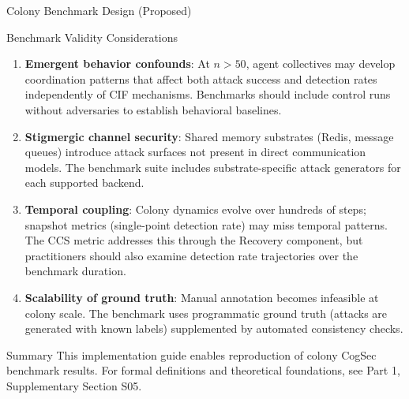 \documentclass[
  ignorenonframetext,
]{beamer}
\begin{document}
\begin{frame}[fragile]{Colony Benchmark Design (Proposed)}
\begin{block}{Benchmark Validity Considerations}
\begin{enumerate}
\item
  \textbf{Emergent behavior confounds}: At \(n > 50\), agent collectives
  may develop coordination patterns that affect both attack success and
  detection rates independently of CIF mechanisms. Benchmarks should
  include control runs without adversaries to establish behavioral
  baselines.
\item
  \textbf{Stigmergic channel security}: Shared memory substrates (Redis,
  message queues) introduce attack surfaces not present in direct
  communication models. The benchmark suite includes substrate-specific
  attack generators for each supported backend.
\item
  \textbf{Temporal coupling}: Colony dynamics evolve over hundreds of
  steps; snapshot metrics (single-point detection rate) may miss
  temporal patterns. The CCS metric addresses this through the Recovery
  component, but practitioners should also examine detection rate
  trajectories over the benchmark duration.
\item
  \textbf{Scalability of ground truth}: Manual annotation becomes
  infeasible at colony scale. The benchmark uses programmatic ground
  truth (attacks are generated with known labels) supplemented by
  automated consistency checks.
\end{enumerate}
\end{block}

\begin{block}{Summary}
\protect{}\label{summary}
This implementation guide enables reproduction of colony CogSec
benchmark results. For formal definitions and theoretical foundations,
see Part 1, Supplementary Section S05.
\end{block}
\end{frame}
\end{document}
